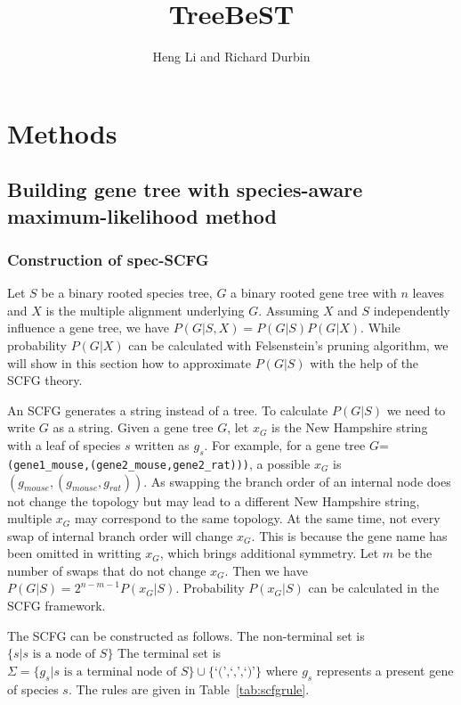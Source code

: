 \documentclass[pdftex,10pt]{article}
\title{TreeBeST}
\author{Heng Li and Richard Durbin}
\begin{document}
\section{Methods}

\subsection{Building gene tree with species-aware maximum-likelihood method}

\subsubsection{Construction of spec-SCFG}

Let $S$ be a binary rooted species tree, $G$ a binary rooted gene tree
with $n$ leaves and $X$ is the multiple alignment underlying
$G$. Assuming $X$ and $S$ independently influence a gene tree, we have
$P(G|S,X)=P(G|S)P(G|X)$. While probability $P(G|X)$ can be calculated
with Felsenstein's pruning algorithm, we will show in this section how
to approximate $P(G|S)$ with the help of the SCFG theory.

An SCFG generates a string instead of a tree. To calculate $P(G|S)$ we
need to write $G$ as a string. Given a gene tree $G$, let $x_G$ is
the New Hampshire string with a leaf of species $s$ written as
$g_s$. For example, for a gene tree $G$={\tt
  (gene1\_mouse,(gene2\_mouse,gene2\_rat)))}, a possible $x_G$ is
$(g_{mouse},(g_{mouse},g_{rat}))$. As swapping the branch order of an
internal node does not change the topology but may lead to a different
New Hampshire string, multiple $x_G$ may correspond to the same
topology. At the same time, not every swap of internal branch order will
change $x_G$. This is because the gene name has been omitted in
writting $x_G$, which brings additional symmetry. Let $m$ be the
number of swaps that do not change $x_G$. Then we have
$P(G|S)=2^{n-m-1}P(x_G|S)$. Probability $P(x_G|S)$ can be
calculated in the SCFG framework.

The SCFG can be constructed as follows. The non-terminal set is
$\{s|\mbox{$s$ is a node of $S$}\}$ The terminal set is
$\Sigma=\{g_s|\mbox{$s$ is a terminal node of $S$}\} \cup
\{\mbox{`(',`,',`)'}\}$ where $g_s$ represents a present gene of species
$s$. The rules are given in Table~\ref{tab:scfgrule}.
\end{document}
